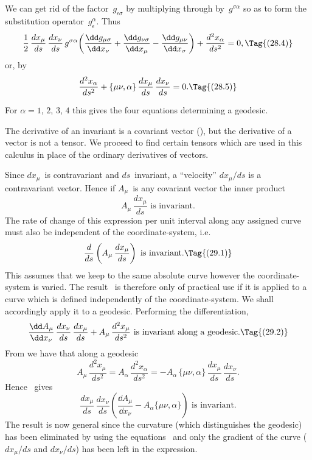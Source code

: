 \documentclass[12pt]{book}
\begin{document}
We can get rid of the factor~$g_{\epsilon\sigma}$ by multiplying through by~$g^{\sigma\alpha}$ so as to
form the substitution operator~$g_{\epsilon}^{\alpha}$. Thus
\[
\frac{1}{2}\, \frac{dx_{\mu}}{ds}\, \frac{dx_{\nu}}{ds}\,
g^{\sigma\alpha} \biggl(\frac{\dd g_{\mu\sigma}}{\dd x_{\nu}} + \frac{\dd g_{\nu\sigma}}{\dd x_{\mu}} - \frac{\dd g_{\mu\nu}}{\dd x_{\sigma}}\biggr)
+ \frac{d^{2} x_{\alpha}}{ds^{2}} = 0,
\Tag{(28.4)}
\]
or, by~
\[
\frac{d^{2} x_{\alpha}}{ds^{2}} + \{\mu\nu, \alpha\}\, \frac{dx_{\mu}}{ds}\, \frac{dx_{\nu}}{ds} = 0.
\Tag{(28.5)}
\]

For $\alpha = 1$, $2$, $3$, $4$ this gives the four equations determining a geodesic.

%
%

The derivative of an invariant is a covariant vector (), but the
derivative of a vector is not a tensor. We proceed to find certain tensors
which are used in this calculus in place of the ordinary derivatives of vectors.

Since $dx_{\mu}$~is contravariant and $ds$~invariant, a ``velocity'' $dx_{\mu}/ds$ is a
contravariant vector. Hence if $A_{\mu}$~is any covariant vector the inner product
\[
A_{\mu}\, \frac{dx_{\mu}}{ds} \text{ is invariant.}
\]
The rate of change of this expression per unit interval along any assigned
curve must also be independent of the coordinate-system, i.e.\
\[
\frac{d}{ds} \left(A_{\mu}\, \frac{dx_{\mu}}{ds}\right)
\text{ is invariant.}
\Tag{(29.1)}
\]
This assumes that we keep to the same absolute curve however the coordinate-system
is varied. The result~\Eq{(29.1)} is therefore only of practical use if it is
applied to a curve which is defined independently of the coordinate-system.
We shall accordingly apply it to a geodesic. Performing the differentiation,
\[
\frac{\dd A_{\mu}}{\dd x_{\nu}}\, \frac{dx_{\nu}}{ds}\, \frac{dx_{\mu}}{ds}
+ A_{\mu}\, \frac{d^{2}x_{\mu}}{ds^{2}} \text{ is invariant along a geodesic.}
\Tag{(29.2)}
\]
From  we have that along a geodesic
\[
A_{\mu}\, \frac{d^{2}x_{\mu}}{ds^{2}} = A_{\alpha}\, \frac{d^{2}x_{\alpha}}{ds^{2}}
= -A_{\alpha}\, \{\mu\nu, \alpha\}\, \frac{dx_{\mu}}{ds}\, \frac{dx_{\nu}}{ds}.
\]
Hence ~gives
\[
\frac{dx_{\mu}}{ds}\, \frac{dx_{\nu}}{ds} \left(\frac{\dd A_{\mu}}{\dd x_{\nu}} - A_{\alpha} \{\mu\nu, \alpha\}\right) \text{ is invariant.}
\]
The result is now general since the curvature (which distinguishes the
geodesic) has been eliminated by using the equations~\Eq{(28.5)} and only the
gradient of the curve ($dx_{\mu}/ds$ and $dx_{\nu}/ds$) has been left in the expression.
\end{document}
